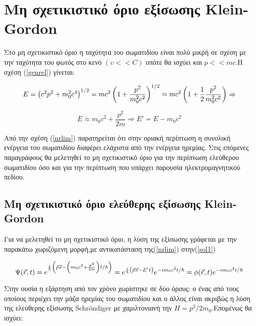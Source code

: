 \section{Μη σχετικιστικό όριο εξίσωσης \textlatin{Klein-Gordon}}

Στο μη σχετικιστικό όριο η ταχύτητα του σωματιδίου είναι πολύ μικρή σε σχέση με την ταχύτητα του φωτός στο κενό $(\upsilon<<C)$ οπότε θα ισχύει και $p<<mc$.Η σχέση (\ref{genrel}) γίνεται: 

\[
  E=\left(  c^2p^2+m_0^2c^4 \right) ^{1/2} =mc^2 \left(  1+ \frac{p^2}{m_0^2c^2} \right) ^{1/2} \approx mc^2 \left(  1+ \frac{1}{2} \frac{p^2}{m_0^2c^2} \right)  \Rightarrow
\]

\begin{equation}
  E \approx  m_0 c^2 + \frac{p^2}{2m} \Rightarrow E'=E - m_0 c^2
  \label{nrlim}
\end{equation}

Από την σχέση (\ref{nrlim}) παρατηρείται ότι στην οριακή περίπτωση η συνολική ενέργεια του σωματιδίου διαφέρει ελάχιστα από την ενέργεια ηρεμίας. Στις επόμενες παραγράφους θα μελετηθεί το μη σχετικιστικό όριο για την περίπτωση ελεύθερου σωματιδίου όσο και για την περίπτωση που υπάρχει παρουσία ηλεκτρομαγνητικού πεδίου.

\subsection{Μη σχετικιστικό όριο ελεύθερης εξίσωσης \textlatin{Klein-Gordon}}

Για να μελετηθεί το μη σχετικιστικό όριο, η λύση της εξίσωσης γράφεται με την παρακάτω χωριζόμενη μορφή,με αντικατάσταση της(\ref{nrlim}) στην(\ref{sol1})


\begin{equation}
  \Psi(\vec{r},t) =e^{ \frac{i}{\hbar}\left(  \vec{p}\vec{x} -\left(  m_0 c^2 + \frac{p^2}{2m} \right)  t/\hbar \right)  }=e^{ \frac{i}{\hbar}\left(  \vec{p}\vec{x} -E't \right) } e^{-im_0c^2t/\hbar }= \phi(\vec{r},t)e^{-im_0c^2t/\hbar } 
  \label{soludist}
\end{equation}

Στην ουσία η εξάρτηση από τον χρόνο χωρίστηκε σε δύο όρους: ο ένας από τους οποίους περιέχει την μάζα ηρεμίας του σωματιδίου και ο άλλος είναι ακριβώς η λύση της ελεύθερης εξίσωσης \textlatin{Schr\"ondiger} με χαμιλτονιανή την $H=p^2/2m_0$.Επομένως θα ισχύει: 

